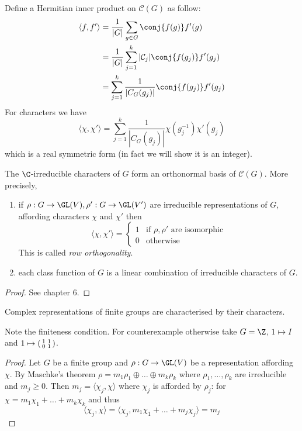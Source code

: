 \documentclass[a4paper]{article}
\begin{document}
Define a Hermitian inner product on \(\mathcal C(G)\) as follow:
\begin{align*}
  \langle f, f' \rangle
  &= \frac{1}{|G|} \sum_{g \in G} \conj{f(g)} f'(g) \\
  &= \frac{1}{|G|} \sum_{j = 1}^k |\mathcal C_j| \conj{f(g_j)} f'(g_j) \\
  &= \sum_{j = 1}^k \frac{1}{|C_G(g_j)|} \conj{f(g_j)} f'(g_j)
\end{align*}
For characters we have
\[
  \langle \chi, \chi' \rangle
  = \sum_{j = 1}^k \frac{1}{|C_G(g_j)|} \chi(g_j^{-1}) \chi'(g_j)
\]
which is a real symmetric form (in fact we will show it is an integer).

\begin{theorem}
  The \(\C\)-irreducible characters of \(G\) form an orthonormal basis of \(\mathcal C(G)\). More precisely,
  \begin{enumerate}
  \item if \(\rho: G \to \GL(V), \rho': G \to \GL(V')\) are irreducible representations of \(G\), affording characters \(\chi\) and \(\chi'\) then
    \[
      \langle \chi, \chi' \rangle =
      \begin{cases}
        1 & \text{if \(\rho, \rho'\) are isomorphic} \\
        0 & \text{otherwise}
      \end{cases}
    \]
    This is called \emph{row orthogonality}.
  \item each class function of \(G\) is a linear combination of irreducible characters of \(G\).
  \end{enumerate}
\end{theorem}

\begin{proof}
  See chapter 6.
\end{proof}

\begin{corollary}
  Complex representations of finite groups are characterised by their characters.
\end{corollary}

Note the finiteness condition. For counterexample otherwise take \(G = \Z\), \(1 \mapsto I\) and \(1 \mapsto
\begin{psmallmatrix}
  1 & 1 \\
  0 & 1
\end{psmallmatrix}
\).

\begin{proof}
  Let \(G\) be a finite group and \(\rho: G \to \GL(V)\) be a representation affording \(\chi\). By Maschke's theorem \(\rho = m_1 \rho_1 \oplus \dots \oplus m_k \rho_k\) where \(\rho_1, \dots, \rho_k\) are irreducible and \(m_j \geq 0\). Then \(m_j = \langle \chi_j, \chi \rangle\) where \(\chi_j\) is afforded by \(\rho_j\): for \(\chi = m_1 \chi_1 + \dots + m_k \chi_k\) and thus
  \[
    \langle \chi_j, \chi \rangle
    = \langle \chi_j, m_1 \chi_1 + \dots + m_j \chi_j \rangle
    = m_j
  \]
\end{proof}
\end{document}
